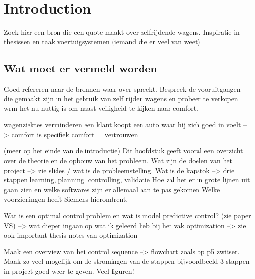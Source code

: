 \chapter{Introduction}
\label{cha:intro}

Zoek hier een bron die een quote maakt over zelfrijdende wagens. Inspiratie in thesissen en taak voertuigsystemen (iemand die er veel van weet)

\section{Wat moet er vermeld worden}
Goed refereren naar de bronnen waar over spreekt. Bespreek de vooruitgangen die gemaakt zijn in het gebruik van zelf rijden wagens en probeer te verkopen wrm het nu nuttig is om naast veiligheid te kijken naar comfort. 

wagenziektes verminderen
een klant koopt een auto waar hij zich goed in voelt --> comfort is specifiek
comfort = vertrouwen




(meer op het einde van de introductie)
Dit hoofdstuk geeft vooral een overzicht over de theorie en de opbouw van het probleem.
Wat zijn de doelen van het project --> zie slides / wat is de probleemstelling.
Wat is de kapstok --> drie stappen learning, planning, controlling, validatie
Hoe zal het er in grote lijnen uit gaan zien en welke softwares zijn er allemaal aan te pas gekomen
Welke voorzieningen heeft Siemens hieromtrent.

Wat is een optimal control problem en wat is model predictive control? (zie paper VS)
--> wat dieper ingaan op wat ik geleerd heb bij het vak optimization --> zie ook important thesis notes van optimization

Maak een overview van het control sequence --> flowchart zoals op p5 zwitser. Maak zo veel mogelijk om de stromingen van de stappen bijvoordbeeld 3 stappen in project goed weer te geven. Veel figuren!



